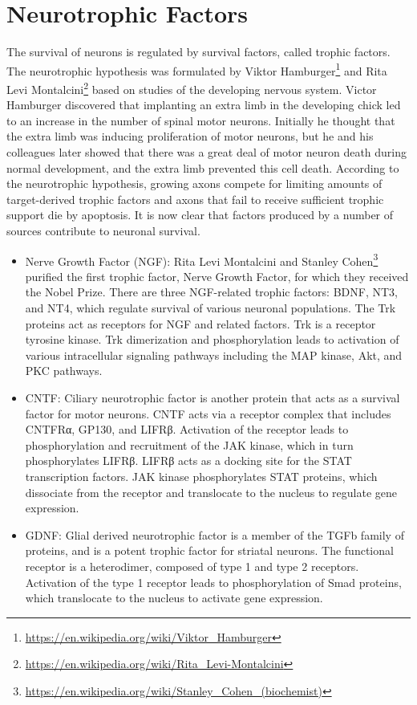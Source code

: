\documentclass[]{book}
\providecommand{\tightlist}{%
  \setlength{\itemsep}{0pt}\setlength{\parskip}{0pt}}
\let\rmarkdownfootnote\footnote%
\def\footnote{\protect\rmarkdownfootnote}
\renewcommand{\href}[2]{#2\footnote{\url{#1}}}
\begin{document}
\hypertarget{neurotrophic-factors}{%
\section{Neurotrophic Factors}\label{neurotrophic-factors}}

The survival of neurons is regulated by survival factors, called trophic factors. The neurotrophic hypothesis was formulated by \href{https://en.wikipedia.org/wiki/Viktor_Hamburger}{Viktor Hamburger} and \href{https://en.wikipedia.org/wiki/Rita_Levi-Montalcini}{Rita Levi Montalcini} based on studies of the developing nervous system. Victor Hamburger discovered that implanting an extra limb in the developing chick led to an increase in the number of spinal motor neurons. Initially he thought that the extra limb was inducing proliferation of motor neurons, but he and his colleagues later showed that there was a great deal of motor neuron death during normal development, and the extra limb prevented this cell death. According to the neurotrophic hypothesis, growing axons compete for limiting amounts of target-derived trophic factors and axons that fail to receive sufficient trophic support die by apoptosis. It is now clear that factors produced by a number of sources contribute to neuronal survival.

\begin{itemize}
\tightlist
\item
  Nerve Growth Factor (NGF): Rita Levi Montalcini and \href{https://en.wikipedia.org/wiki/Stanley_Cohen_(biochemist)}{Stanley Cohen} purified the first trophic factor, Nerve Growth Factor, for which they received the Nobel Prize. There are three NGF-related trophic factors: BDNF, NT3, and NT4, which regulate survival of various neuronal populations. The Trk proteins act as receptors for NGF and related factors. Trk is a receptor tyrosine kinase. Trk dimerization and phosphorylation leads to activation of various intracellular signaling pathways including the MAP kinase, Akt, and PKC pathways.
\item
  CNTF: Ciliary neurotrophic factor is another protein that acts as a survival factor for motor neurons. CNTF acts via a receptor complex that includes CNTFRα, GP130, and LIFRβ. Activation of the receptor leads to phosphorylation and recruitment of the JAK kinase, which in turn phosphorylates LIFRβ. LIFRβ acts as a docking site for the STAT transcription factors. JAK kinase phosphorylates STAT proteins, which dissociate from the receptor and translocate to the nucleus to regulate gene expression.
\item
  GDNF: Glial derived neurotrophic factor is a member of the TGFb family of proteins, and is a potent trophic factor for striatal neurons. The functional receptor is a heterodimer, composed of type 1 and type 2 receptors. Activation of the type 1 receptor leads to phosphorylation of Smad proteins, which translocate to the nucleus to activate gene expression.
\end{itemize}
\end{document}
